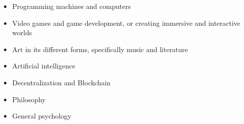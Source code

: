 



\begin{cventries}

\begin{itemize}
    \item Programming machines and computers
    \item Video games and game development, or creating immersive and interactive worlds
    \item Art in its different forms, specifically music and literature
    \item Artificial intelligence
    \item Decentralization and Blockchain
    \item Philosophy
    \item General psychology
\end{itemize}


\end{cventries}